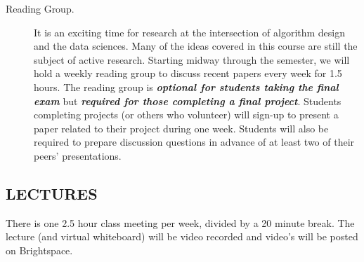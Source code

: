 \documentclass[10pt]{article}
\begin{document}
\begin{description}
	\item[Reading Group.] It is an exciting time for research at the intersection of algorithm design and the data sciences. Many of the ideas covered in this course are still the subject of active research. Starting midway through the semester, we will hold a weekly reading group to discuss recent papers every  week for 1.5 hours. The reading group is \textbf{\emph{optional for students taking the final exam}} but \textbf{\emph{required for those completing a final project}}. Students completing projects (or others who volunteer) will sign-up to present a paper related to their project during one week. Students will also be required to prepare discussion questions in advance of at least two of their peers' presentations. 
\end{description}

\subsection{LECTURES}

There is one 2.5 hour class meeting per week, divided by a 20 minute break.  The lecture (and virtual whiteboard) will be video recorded and video's will be posted on Brightspace. 

\end{document}
